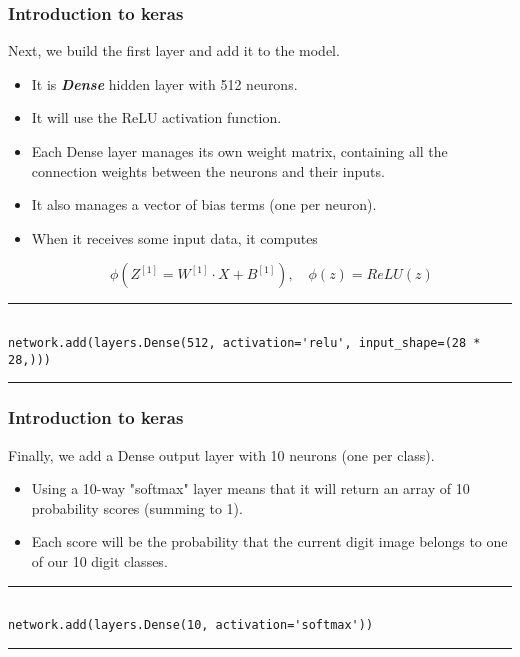 \documentclass[11pt]{beamer}
\begin{document}
\begin{frame}[fragile]
\frametitle{Introduction to keras}

Next, we build the first layer and add it to the model. 
\begin{itemize}
\item It is \textbf{\textit{Dense}} hidden layer with 512 neurons. 
\item It will use the ReLU activation function. 
\item Each Dense layer manages its own weight matrix, containing all the connection weights between the neurons and their inputs. 
\item It also manages a vector of bias terms (one per neuron). 
\item When it receives some input data, it computes 

$$\phi \left( Z^{[1]} = W^{[1]} \cdot X + B^{[1]} \right), \quad \phi(z) = \textit{ReLU}(z)$$
\end{itemize}
\rule{\textwidth}{1pt}
\scriptsize
\begin{verbatim}

network.add(layers.Dense(512, activation='relu', input_shape=(28 * 28,)))

\end{verbatim}
\rule{\textwidth}{1pt}

\end{frame}
\begin{frame}[fragile]
\frametitle{Introduction to keras}

Finally, we add a Dense output layer with 10 neurons (one per class). 
\begin{itemize}
\item Using a 10-way "softmax" layer means that it will return an array of 10 probability scores (summing to 1). 
\item Each score will be the probability that the current digit image belongs to one of our 10 digit classes.
\end{itemize}

\rule{\textwidth}{1pt}
\scriptsize
\begin{verbatim}

network.add(layers.Dense(10, activation='softmax'))

\end{verbatim}
\rule{\textwidth}{1pt}
\end{frame}
\end{document}
